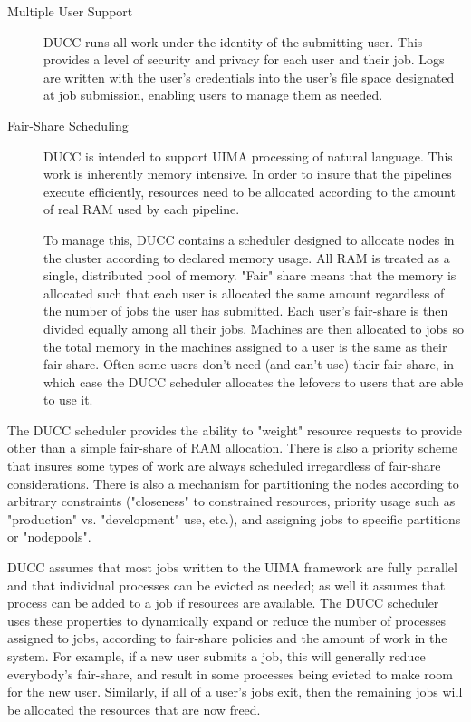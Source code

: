     \begin{description}
        \item[Multiple User Support] DUCC runs all work under the identity of the submitting user. This
          provides a level of security and privacy for each user and their job. Logs are written with the
          user's credentials into the user's file space designated at job submission, enabling users to
          manage them as needed.

        \item[Fair-Share Scheduling] DUCC is intended to support UIMA processing of natural
          language.  This work is inherently memory intensive. In order to insure that the pipelines
          execute efficiently, resources need to be allocated according to the amount of real RAM used
          by each pipeline.
          
          To manage this, DUCC contains a scheduler designed to allocate nodes in the cluster according to
          declared memory usage. All RAM is treated as a single, distributed pool of memory. "Fair" share
          means that the memory is allocated such that each user is allocated the same amount regardless
          of the number of jobs the user has submitted. Each user's fair-share is then divided equally
          among all their jobs. Machines are then allocated to jobs so the total memory in the machines
          assigned to a user is the same as their fair-share. Often some users don't need (and can't use)
          their fair share, in which case the DUCC scheduler allocates the lefovers to users that are able
          to use it.
    \end{description}

    The DUCC scheduler provides the ability to "weight" resource requests to provide other than
    a simple fair-share of RAM allocation. There is also a priority scheme that insures some types of
    work are always scheduled irregardless of fair-share considerations. There is also a mechanism
    for partitioning the nodes according to arbitrary constraints ("closeness" to constrained
    resources, priority usage such as "production" vs. "development" use, etc.), and assigning jobs
    to specific partitions or "nodepools".

    DUCC assumes that most jobs written to the UIMA framework are fully parallel and that individual
    processes can be evicted as needed; as well it assumes that process can be added to a job if
    resources are available. The DUCC scheduler uses these properties to dynamically expand or
    reduce the number of processes assigned to jobs, according to fair-share policies and the amount
    of work in the system. For example, if a new user submits a job, this will generally reduce
    everybody's fair-share, and result in some processes being evicted to make room for the new
    user.  Similarly, if all of a user's jobs exit, then the remaining jobs will be allocated the
    resources that are now freed. 

